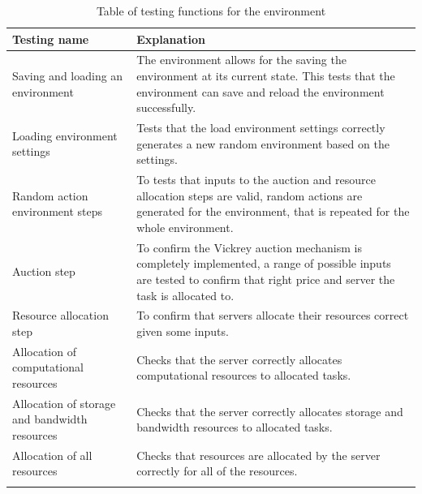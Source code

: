 \begin{longtable}{|p{3cm}|p{11cm}|} \hline
    \textbf{Testing name} & \textbf{Explanation} \\ \hline
    Saving and loading an environment & The environment allows for the saving the environment at its current
        state. This tests that the environment can save and reload the environment successfully. \\ \hline
    Loading environment settings & Tests that the load environment settings correctly generates a new random
        environment based on the settings. \\ \hline
    Random action environment steps & To tests that inputs to the auction and resource allocation steps are valid,
        random actions are generated for the environment, that is repeated for the whole environment.  \\ \hline
    Auction step & To confirm the Vickrey auction mechanism is completely implemented, a range of possible inputs
        are tested to confirm that right price and server the task is allocated to. \\ \hline
    Resource allocation step & To confirm that servers allocate their resources correct given some inputs. \\ \hline
    Allocation of computational resources & Checks that the server correctly allocates computational resources to
        allocated tasks. \\ \hline
    Allocation of storage and bandwidth resources & Checks that the server correctly allocates storage and
        bandwidth resources to allocated tasks. \\ \hline
    Allocation of all resources & Checks that resources are allocated by the server correctly for all of the
        resources. \\ \hline
    \caption{Table of testing functions for the environment}
    \label{tab:env_testing}
\end{longtable}

